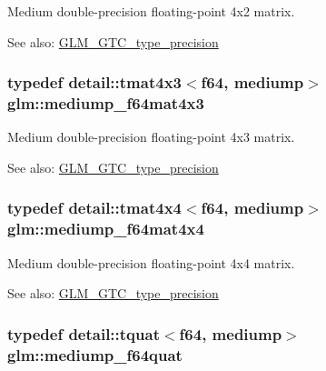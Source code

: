 Medium double-precision floating-point 4x2 matrix. \begin{Desc}
\item[See also:]\hyperlink{group__gtc__type__precision}{GLM\_\-GTC\_\-type\_\-precision} \end{Desc}
\hypertarget{group__gtc__type__precision_g4a920abfb082b0ffd8d89614cb787021}{
\subsubsection[mediump\_\-f64mat4x3]{\setlength{\rightskip}{0pt plus 5cm}typedef detail::tmat4x3$<$f64, mediump$>$ {\bf glm::mediump\_\-f64mat4x3}}}
\label{group__gtc__type__precision_g4a920abfb082b0ffd8d89614cb787021}


Medium double-precision floating-point 4x3 matrix. \begin{Desc}
\item[See also:]\hyperlink{group__gtc__type__precision}{GLM\_\-GTC\_\-type\_\-precision} \end{Desc}
\hypertarget{group__gtc__type__precision_g941e42a0b337b5c8ad9c324aaa6b2ad5}{
\subsubsection[mediump\_\-f64mat4x4]{\setlength{\rightskip}{0pt plus 5cm}typedef detail::tmat4x4$<$f64, mediump$>$ {\bf glm::mediump\_\-f64mat4x4}}}
\label{group__gtc__type__precision_g941e42a0b337b5c8ad9c324aaa6b2ad5}


Medium double-precision floating-point 4x4 matrix. \begin{Desc}
\item[See also:]\hyperlink{group__gtc__type__precision}{GLM\_\-GTC\_\-type\_\-precision} \end{Desc}
\hypertarget{group__gtc__type__precision_g7cf626acf7f4fc29355c147bfe05163d}{
\subsubsection[mediump\_\-f64quat]{\setlength{\rightskip}{0pt plus 5cm}typedef detail::tquat$<$f64, mediump$>$ {\bf glm::mediump\_\-f64quat}}}
\label{group__gtc__type__precision_g7cf626acf7f4fc29355c147bfe05163d}


